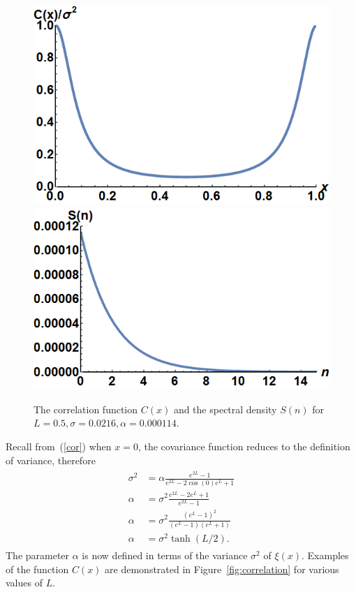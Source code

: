 \begin{figure}[htp]
\caption[Example of a covariance-spectrum pair]{The correlation function
  $C(x)$ and the spectral density $S(n)$ for $L=0.5,\sigma=0.0216, \alpha=0.000114$.}\label{fig:covspec}
\centering
\includegraphics[width=.45\textwidth]{figs/cx.png}\hfill
\includegraphics[width=.45\textwidth]{figs/sn.png}
\end{figure}
Recall from~(\ref{cor}) when $x=0$, the covariance function reduces to the definition
of variance, therefore
\begin{align}
\begin{split}\label{a}
\sigma^2&= \alpha \frac{e^{2L}-1}{e^{2L}-2\cos(0)e^L+1}\\
\alpha &=\sigma^2 \frac{e^{2L}-2e^{L} +1}{e^{2L}-1}\\
\alpha &=\sigma^2
\frac{(e^{L}-1)^2}{(e^{L}-1)(e^{L}+1)}\\
\alpha &= \sigma^2 \tanh(L/2).
\end{split}
\end{align}
The parameter $\alpha$ is now defined in terms of the variance
$\sigma^2$ of $\xi(x)$. Examples of the function $C(x)$ are demonstrated in Figure~\ref{fig:correlation}
for various values of $L$.
